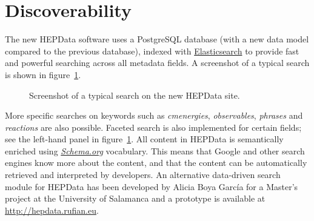 \documentclass[a4paper]{jpconf}
\begin{document}
\section{Discoverability}

The new HEPData software uses a PostgreSQL database (with a new data model compared to the previous database), indexed with \href{https://www.elastic.co}{Elasticsearch} to provide fast and powerful searching across all metadata fields.  A screenshot of a typical search is shown in figure~\ref{fig:search}.
%
\begin{figure}
  \begin{center}
  \end{center}
  \caption{\label{fig:search}Screenshot of a typical search on the new HEPData site.}
\end{figure}
%
More specific searches on keywords such as \emph{cmenergies}, \emph{observables}, \emph{phrases} and \emph{reactions} are also possible.  Faceted search is also implemented for certain fields; see the left-hand panel in figure~\ref{fig:search}.  All content in HEPData is semantically enriched using \href{https://schema.org/}{\emph{Schema.org}} vocabulary.  This means that Google and other search engines know more about the content, and that the content can be automatically retrieved and interpreted by developers.  An alternative data-driven search module for HEPData has been developed by Alicia Boya Garc\'{i}a for a Master's project at the University of Salamanca and a prototype is available at \url{http://hepdata.rufian.eu}.
\end{document}
